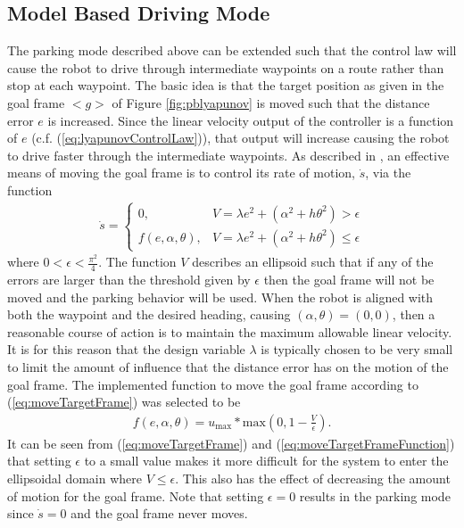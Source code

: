 \subsection{Model Based Driving Mode}
\label{sec:drivingMode}
The parking mode described above can be extended such that the control law will cause the robot to drive through intermediate waypoints on a route rather than stop at each waypoint. The basic idea is that the target position as given in the goal frame $<g>$ of Figure \ref{fig:pblyapunov} is moved such that the distance error $e$ is increased. Since the linear velocity output of the controller is a function of $e$ (c.f. (\ref{eq:lyapunovControlLaw})), that output will increase causing the robot to drive faster through the intermediate waypoints. As described in \cite{Aicardi_UnicycleLyapunov95}, an effective means of moving the goal frame is to control its rate of motion, $\dot{s}$, via the function
\begin{align}
\label{eq:moveTargetFrame}
\dot{s} =
\begin{cases}
0, & V = \lambda e^2 + (\alpha^2+h\theta^2) > \epsilon \\
f(e,\alpha,\theta), & V = \lambda e^2 + (\alpha^2+h\theta^2) \leq \epsilon
\end{cases}
\end{align}
where $0<\epsilon<\frac{\pi^2}{4}$. The function $V$ describes an ellipsoid such that if any of the errors are larger than the threshold given by $\epsilon$ then the goal frame will not be moved and the parking behavior will be used. When the robot is aligned with both the waypoint and the desired heading, causing $(\alpha,\theta)=(0,0)$, then a reasonable course of action is to maintain the maximum allowable linear velocity. It is for this reason that the design variable $\lambda$ is typically chosen to be very small to limit the amount of influence that the distance error has on the motion of the goal frame. The implemented function to move the goal frame according to (\ref{eq:moveTargetFrame}) was selected to be
\begin{align}
\label{eq:moveTargetFrameFunction}
f(e,\alpha,\theta) = u_{\text{max}} * \text{max}\left(0, 1 - \frac{V}{\epsilon}\right).
\end{align}
It can be seen from (\ref{eq:moveTargetFrame}) and (\ref{eq:moveTargetFrameFunction}) that setting $\epsilon$ to a small value makes it more difficult for the system to enter the ellipsoidal domain where $V\leq\epsilon$. This also has the effect of decreasing the amount of motion for the goal frame. Note that setting $\epsilon=0$ results in the parking mode since $\dot{s}=0$ and the goal frame never moves.

